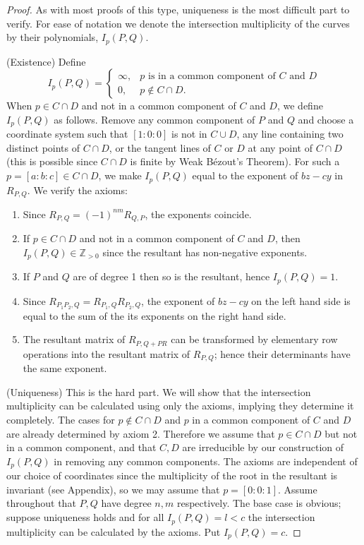 \documentclass{article}
\theoremstyle{remark}
\begin{document}
\begin{proof}
As with most proofs of this type, uniqueness is the most difficult part to verify. For ease of notation we denote the intersection multiplicity of the curves by their polynomials, $I_{p}(P,Q)$.
\item (Existence) Define 
\[I_{p}(P,Q)=\begin{cases}
    \infty,                       & \text{$p$ is in a common component of $C$ and $D$}\\
    0,                            & \text{$p\not\in C\cap D$}.
  \end{cases}\]
When $p\in C\cap D$ and not in a common component of $C$ and $D$, we define $I_{p}(P,Q)$ as follows. Remove any common component of $P$ and $Q$ and choose a coordinate system such that $[1:0:0]$ is not in $C\cup D$, any line containing two distinct points of $C\cap D$, or the tangent lines of $C$ or $D$ at any point of $C\cap D$ (this is possible since $C\cap D$ is finite by Weak Bézout's Theorem). For such a $p=[a:b:c]\in C\cap D$, we make $I_{p}(P,Q)$ equal to the exponent of $bz-cy$ in $R_{P,Q}$. We verify the axioms:
\begin{enumerate} \item Since $R_{P,Q}=(-1)^{nm} R_{Q,P}$, the exponents coincide.
\item If $p\in C\cap D$ and not in a common component of $C$ and $D$, then $I_{p}(P,Q)\in\mathbb{Z}_{>0}$ since the resultant has non-negative exponents.
\item If $P$ and $Q$ are of degree 1 then so is the resultant, hence $I_{p}(P,Q)=1$.
\item Since $R_{P_1 P_2,Q}=R_{P_1,Q} R_{P_2,Q}$, the exponent of $bz-cy$ on the left hand side is equal to the sum of the its exponents on the right hand side.
\item The resultant matrix of $R_{P,Q+PR}$ can be transformed by elementary row operations into the resultant matrix of $R_{P,Q}$; hence their determinants have the same exponent.
\end{enumerate}
\item (Uniqueness) This is the hard part.  We will show that the intersection multiplicity can be calculated using only the axioms, implying they determine it completely. The cases for $p\not\in C\cap D$ and $p$ in a common component of $C$ and $D$ are already determined by axiom 2. Therefore we assume that $p\in C\cap D$ but not in a common component, and that $C,D$ are irreducible by our construction of $I_p (P,Q)$ in removing any common components. The axioms are independent of our choice of coordinates since the multiplicity of the root in the resultant is invariant (see Appendix), so we may assume that $p=[0:0:1]$. Assume throughout that $P,Q$ have degree $n,m$ respectively. The base case is obvious; suppose uniqueness holds and for all $I_p(P,Q)=l<c$ the intersection multiplicity can be calculated by the axioms. Put $I_p(P,Q)=c$.


\end{proof}
\end{document}
